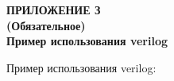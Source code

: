 \clearpage
{}%
\par

\normalsize
\begin{center}
  \textbf{ПРИЛОЖЕНИЕ З} \\
  \textbf{(Обязательное)} \\
  \textbf{Пример использования verilog}
\end{center}


Пример использования verilog:

% 

\pdfpagewidth=210mm
\pdfpageheight=297mm

